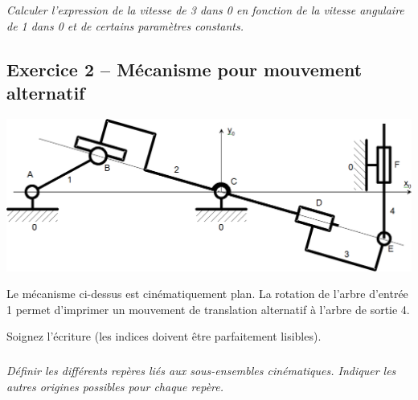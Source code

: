 \documentclass[11pt,oneside]{article}
\begin{document}
\subparagraph{}
\textit{Calculer l'expression de la vitesse de 3 dans 0 en fonction de la vitesse angulaire de 1 dans 0 et de certains paramètres constants.}



\subsection*{Exercice 2 -- Mécanisme pour mouvement alternatif}
\setcounter{subparagraph}{0}
 
\begin{center}
\includegraphics[width=.7\textwidth]{png/fig2_1} 
\end{center}

Le mécanisme ci-dessus est cinématiquement plan. La rotation de l'arbre d'entrée 1 permet d'imprimer un mouvement de translation alternatif à l'arbre de sortie 4.

\begin{rem}
Soignez l'écriture (les indices doivent être parfaitement lisibles).
\end{rem}

\subparagraph{}
\textit{Définir les différents repères liés aux sous-ensembles cinématiques. Indiquer les autres origines possibles pour chaque repère.}


\end{document}
